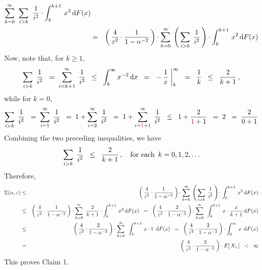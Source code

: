 \begin{enumerate}
\begin{eqnarray*}
	\overset{\infty}{\underset{k=0}{\sum}}\;\;
	\underset{i > k}{\sum}\;\;
	\dfrac{1}{i^{2}} \cdot  \int_{k}^{k+1}\, x^{2} \,\textnormal{d} F(x)
\\
& = &
	\left(\,\dfrac{4}{\varepsilon^{2}} \cdot \dfrac{1}{1-\alpha^{-2}}\,\right) \cdot
	\overset{\infty}{\underset{k=0}{\sum}}\;
	\left(\,\underset{i > k}{\sum}\;\, \dfrac{1}{i^{2}}\,\right) \cdot
	\int_{k}^{k+1}\, x^{2} \,\textnormal{d} F(x)
\end{eqnarray*}
Now, note that, for $k \geq 1$,
\begin{equation*}
\underset{i > k}{\sum}\;\, \dfrac{1}{i^{2}}
\;\; = \;
	\overset{\infty}{\underset{i = k+1}{\sum}}\;\, \dfrac{1}{i^{2}}
\;\; \leq \;\;
	\int_{k}^{\infty}x^{-2}\,\textnormal{d} x
\;\; = \;\;
	\left. -\,\dfrac{1}{x}\;\right\vert_{k}^{\infty}
\;\; = \;\;
	\dfrac{1}{k}
\;\; \leq \;\;
	\dfrac{2}{k+1}\,,
\end{equation*}
while for $k = 0$,
\begin{equation*}
\underset{i > k}{\sum}\;\, \dfrac{1}{i^{2}}
\;\; = \;
	\overset{\infty}{\underset{i = 1}{\sum}}\;\, \dfrac{1}{i^{2}}
\;\; = \;
	1 + \overset{\infty}{\underset{i = 2}{\sum}}\;\, \dfrac{1}{i^{2}}
\;\; = \;
	1 + \overset{\infty}{\underset{i = {\color{red}1}+1}{\sum}}\;\, \dfrac{1}{i^{2}}
\;\; \leq \;\;
	1 + \dfrac{2}{{\color{red}1}+1}
\;\; = \;
	2
\;\; = \;
	\dfrac{2}{0 + 1}
\end{equation*}
Combining the two preceding inequalities, we have
\begin{equation*}
\underset{i > k}{\sum}\;\, \dfrac{1}{i^{2}}
\;\; \leq \;\;
	\dfrac{2}{k + 1}\,,
\quad\textnormal{for each \,$k = 0, 1, 2, \ldots$}
\end{equation*}
Therefore,
\begin{eqnarray*}
\Sigma(\alpha,\varepsilon)
& \leq &
	\left(\,\dfrac{4}{\varepsilon^{2}} \cdot \dfrac{1}{1-\alpha^{-2}}\,\right) \cdot
	\overset{\infty}{\underset{k=0}{\sum}}\;
	\left(\,\underset{i > k}{\sum}\;\, \dfrac{1}{i^{2}}\,\right) \cdot
	\int_{k}^{k+1}\, x^{2} \,\textnormal{d} F(x)
\\
& \leq &
	\left(\,\dfrac{4}{\varepsilon^{2}} \cdot \dfrac{1}{1-\alpha^{-2}}\,\right) \cdot
		\overset{\infty}{\underset{k=0}{\sum}}\;\;
		\dfrac{2}{k+1} \cdot
		\int_{k}^{k+1}\, x^{2} \,\textnormal{d} F(x)
	\;\; = \;\;
		\left(\,\dfrac{4}{\varepsilon^{2}} \cdot \dfrac{2}{1-\alpha^{-2}}\,\right) \cdot
		\overset{\infty}{\underset{k=0}{\sum}}\;\;
		\int_{k}^{k+1}\, x \cdot \dfrac{x}{k+1} \,\textnormal{d} F(x)
\\
& \leq &
	\left(\,\dfrac{4}{\varepsilon^{2}} \cdot \dfrac{2}{1-\alpha^{-2}}\,\right) \cdot
	\overset{\infty}{\underset{k=0}{\sum}}\;\;
	\int_{k}^{k+1}\, x \cdot 1 \;\,\textnormal{d} F(x)
	\;\; = \;\;
	\left(\,\dfrac{4}{\varepsilon^{2}} \cdot \dfrac{2}{1-\alpha^{-2}}\,\right) \cdot
	\int_{0}^{\infty}\, x \;\,\textnormal{d} F(x)
\\
& = &
		\left(\,\dfrac{4}{\varepsilon^{2}} \cdot \dfrac{2}{1-\alpha^{-2}}\,\right) \cdot E\!\left[\,X_{1}\,\right]
	\;\; < \;\;
		\infty
\end{eqnarray*}
This proves Claim 1.


\end{enumerate}
